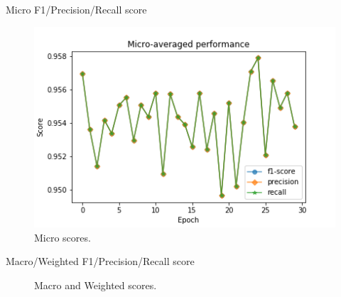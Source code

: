 \documentclass[11pt]{beamer}
\begin{document}
\begin{frame}{Micro F1/Precision/Recall score}
\begin{figure}
\center
\includegraphics[width=0.8\columnwidth]{./images/micro.png}
\caption{Micro scores.}
\end{figure}
\end{frame}

\begin{frame}{Macro/Weighted F1/Precision/Recall score}
\center
\begin{figure}
\caption{Macro and Weighted scores.}
\end{figure}
\end{frame}
\end{document}
